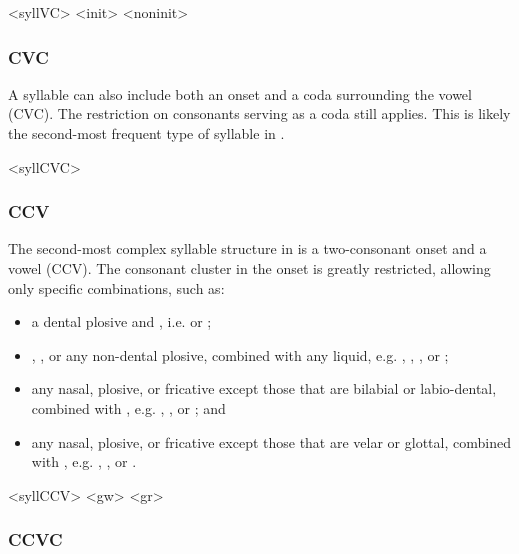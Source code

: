\pex<syllVC>
	\a<init>    
	\a<noninit>    
\xe

\subsubsection{CVC}

A syllable can also include both an onset and a coda surrounding the vowel (CVC). The restriction on consonants serving as a coda still applies. This is likely the second-most frequent type of syllable in \lang{}.

\ex<syllCVC>
	   
\xe

\subsubsection{CCV}

The second-most complex syllable structure in \lang{} is a two-consonant onset and a vowel (CCV). The consonant cluster in the onset is greatly restricted, allowing only specific combinations, such as:

\begin{itemize}
	\item a dental plosive and , i.e.  or ;
	\item {}, , or any non-dental plosive, combined with any liquid, e.g. , , , or ;
	\item any nasal, plosive, or fricative except those that are bilabial or labio-dental, combined with , e.g. , , or ; and
	\item any nasal, plosive, or fricative except those that are velar or glottal, combined with , e.g. , , or .
\end{itemize}

\pex<syllCCV>
	\a<gw>    
	\a<gr>    
\xe

\subsubsection{CCVC}


